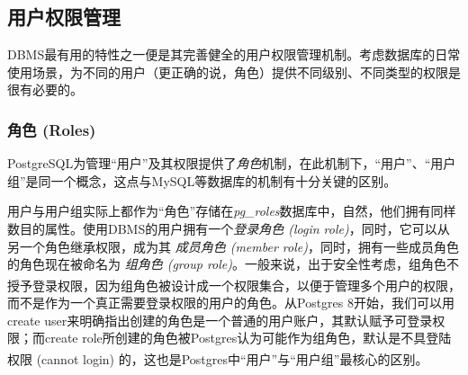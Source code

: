 \subsection{用户权限管理}
DBMS最有用的特性之一便是其完善健全的用户权限管理机制。考虑数据库的日常使用场景，为不同的用户（更正确的说，角色）提供不同级别、不同类型的权限是很有必要的。
\subsubsection{角色 (Roles)}
PostgreSQL为管理“用户”及其权限提供了\emph{角色}机制，在此机制下，“用户”、“用户组”是同一个概念，这点与MySQL等数据库的机制有十分关键的区别。
\par 
用户与用户组实际上都作为“角色”存储在\emph{pg\_roles}数据库中，自然，他们拥有同样数目的属性。使用DBMS的用户拥有一个\emph{登录角色 (login role)}，同时，它可以从另一个角色继承权限，成为其 \emph{成员角色 (member role)}，同时，拥有一些成员角色的角色现在被命名为 \emph{组角色 (group role)}。一般来说，出于安全性考虑，组角色不授予登录权限\textsuperscript{\cite{be-2017}}，因为组角色被设计成一个权限集合，以便于管理多个用户的权限，而不是作为一个真正需要登录权限的用户的角色。从Postgres 8开始，我们可以用create user来明确指出创建的角色是一个普通的用户账户，其默认赋予可登录权限；而create role所创建的角色被Postgres认为可能作为组角色，默认是不具登陆权限 (cannot login) 的\textsuperscript{\cite{obe-2017}}，这也是Postgres中“用户”与“用户组”最核心的区别。\\
